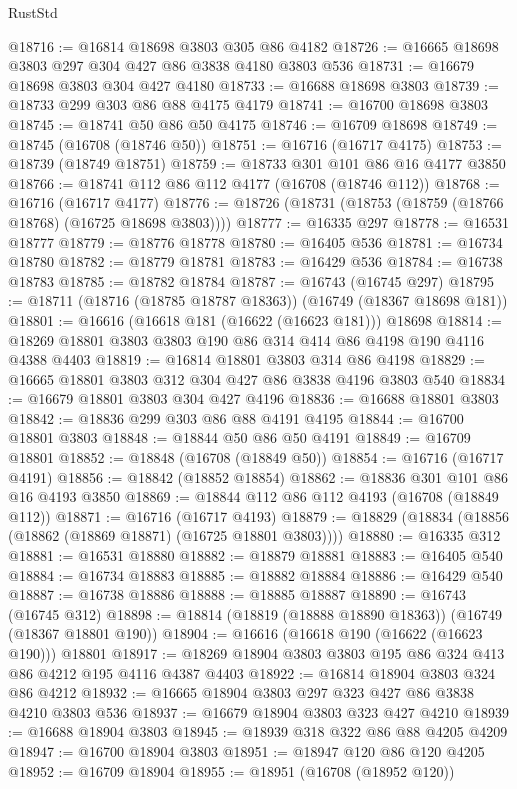 \begin{lexlean}{RustStd}
\begin{coremodule}
@18716 := @16814 @18698 @3803 @305 @86 @4182
@18726 := @16665 @18698 @3803 @297 @304 @427 @86 @3838 @4180 @3803 @536
@18731 := @16679 @18698 @3803 @304 @427 @4180
@18733 := @16688 @18698 @3803
@18739 := @18733 @299 @303 @86 @88 @4175 @4179
@18741 := @16700 @18698 @3803
@18745 := @18741 @50 @86 @50 @4175
@18746 := @16709 @18698
@18749 := @18745 (@16708 (@18746 @50))
@18751 := @16716 (@16717 @4175)
@18753 := @18739 (@18749 @18751)
@18759 := @18733 @301 @101 @86 @16 @4177 @3850
@18766 := @18741 @112 @86 @112 @4177 (@16708 (@18746 @112))
@18768 := @16716 (@16717 @4177)
@18776 := @18726 (@18731 (@18753 (@18759 (@18766 @18768) (@16725 @18698 @3803))))
@18777 := @16335 @297
@18778 := @16531 @18777
@18779 := @18776 @18778
@18780 := @16405 @536
@18781 := @16734 @18780
@18782 := @18779 @18781
@18783 := @16429 @536
@18784 := @16738 @18783
@18785 := @18782 @18784
@18787 := @16743 (@16745 @297)
@18795 := @18711 (@18716 (@18785 @18787 @18363)) (@16749 (@18367 @18698 @181))
@18801 := @16616 (@16618 @181 (@16622 (@16623 @181))) @18698
@18814 := @18269 @18801 @3803 @3803 @190 @86 @314 @414 @86 @4198 @190 @4116 @4388 @4403
@18819 := @16814 @18801 @3803 @314 @86 @4198
@18829 := @16665 @18801 @3803 @312 @304 @427 @86 @3838 @4196 @3803 @540
@18834 := @16679 @18801 @3803 @304 @427 @4196
@18836 := @16688 @18801 @3803
@18842 := @18836 @299 @303 @86 @88 @4191 @4195
@18844 := @16700 @18801 @3803
@18848 := @18844 @50 @86 @50 @4191
@18849 := @16709 @18801
@18852 := @18848 (@16708 (@18849 @50))
@18854 := @16716 (@16717 @4191)
@18856 := @18842 (@18852 @18854)
@18862 := @18836 @301 @101 @86 @16 @4193 @3850
@18869 := @18844 @112 @86 @112 @4193 (@16708 (@18849 @112))
@18871 := @16716 (@16717 @4193)
@18879 := @18829 (@18834 (@18856 (@18862 (@18869 @18871) (@16725 @18801 @3803))))
@18880 := @16335 @312
@18881 := @16531 @18880
@18882 := @18879 @18881
@18883 := @16405 @540
@18884 := @16734 @18883
@18885 := @18882 @18884
@18886 := @16429 @540
@18887 := @16738 @18886
@18888 := @18885 @18887
@18890 := @16743 (@16745 @312)
@18898 := @18814 (@18819 (@18888 @18890 @18363)) (@16749 (@18367 @18801 @190))
@18904 := @16616 (@16618 @190 (@16622 (@16623 @190))) @18801
@18917 := @18269 @18904 @3803 @3803 @195 @86 @324 @413 @86 @4212 @195 @4116 @4387 @4403
@18922 := @16814 @18904 @3803 @324 @86 @4212
@18932 := @16665 @18904 @3803 @297 @323 @427 @86 @3838 @4210 @3803 @536
@18937 := @16679 @18904 @3803 @323 @427 @4210
@18939 := @16688 @18904 @3803
@18945 := @18939 @318 @322 @86 @88 @4205 @4209
@18947 := @16700 @18904 @3803
@18951 := @18947 @120 @86 @120 @4205
@18952 := @16709 @18904
@18955 := @18951 (@16708 (@18952 @120))

\end{coremodule}
\end{lexlean}
